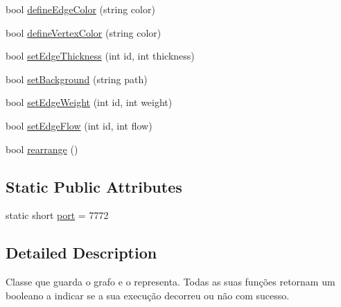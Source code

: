 \begin{DoxyCompactItemize}
\item 
bool \hyperlink{class_graph_viewer_a4102580b69826ba83251ef7bb262f8be}{define\-Edge\-Color} (string color)
\item 
bool \hyperlink{class_graph_viewer_a76de8676b7a93d72af514b84cdaa4d21}{define\-Vertex\-Color} (string color)
\item 
bool \hyperlink{class_graph_viewer_a07f598272fe3515455eab13be749604a}{set\-Edge\-Thickness} (int id, int thickness)
\item 
bool \hyperlink{class_graph_viewer_a02437b5fecd8b90de24436068312d593}{set\-Background} (string path)
\item 
bool \hyperlink{class_graph_viewer_ac211de009a0afe2e6d44f4f8d030a2cc}{set\-Edge\-Weight} (int id, int weight)
\item 
bool \hyperlink{class_graph_viewer_a69eb065145063e4dea41961e92e35c8e}{set\-Edge\-Flow} (int id, int flow)
\item 
bool \hyperlink{class_graph_viewer_a3009a66958686ccb7e78b68e37c3c423}{rearrange} ()
\end{DoxyCompactItemize}
\subsection*{Static Public Attributes}
\begin{DoxyCompactItemize}
\item 
static short \hyperlink{class_graph_viewer_a89d0abe75f41feededc49497cc514342}{port} = 7772
\end{DoxyCompactItemize}


\subsection{Detailed Description}
Classe que guarda o grafo e o representa. Todas as suas funções retornam um booleano a indicar se a sua execução decorreu ou não com sucesso. 

